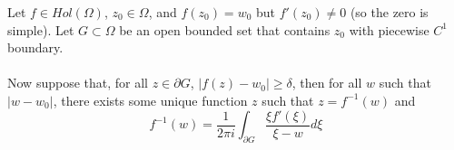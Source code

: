 \documentclass{article}
\begin{document}
\begin{theorem}
Let $f \in Hol(\Omega)$, $z_0 \in \Omega$, and $f(z_0) = w_0$ but $f'(z_0) \neq 0$ (so the zero is simple). Let $G \subset \Omega$ be an open bounded set that contains $z_0$ with piecewise $C^1$ boundary.\\\\
Now suppose that, for all $z \in \partial G$, $|f(z) - w_0| \geq \delta$, then for all $w$ such that $|w - w_0|$, there exists some unique function $z$ such that $z = f^{-1}(w)$ and
\[f^{-1}(w) = \frac{1}{2\pi i} \int_{\partial G} \frac{\xi f'(\xi)}{\xi - w} d\xi\]
\end{theorem}
\end{document}
